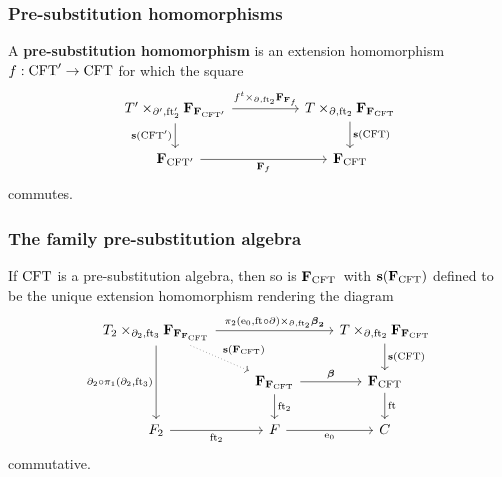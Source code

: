 \documentclass{beamer}
\newcommand\important[1]{\textbf{\color{red!90!black}#1}}
\begin{document}
\begin{frame}
\frametitle{\bf Pre-substitution homomorphisms}
A \important{pre-substitution homomorphism} is an extension homomorphism $f:\mathrm{CFT}'\to \mathrm{CFT}$
for which the square
\begin{equation*}
\begin{tikzcd}[ampersand replacement=\&,column sep=huge]
\cobesys{\stesyst'}{\famesys{\famesys{\stesys'}}}{\ebd'}{\eft[2]'}
  \ar{r}{\pullback{f^t}{\famehom{\famehom{f}}}{\ebd}{\eft[2]}}
  \ar{d}[swap]{\mathbf{s}(\stesys')}
  \&
\cobesys{\stesyst}{\famesys{\famesys{\stesys}}}{\ebd}{\eft[2]}
  \ar{d}{\mathbf{s}(\stesys)}
  \\
\famesys{\stesys'}
  \ar{r}[swap]{\famehom{f}}
  \&
\famesys{\stesys}
\end{tikzcd}
\end{equation*}
commutes.
\end{frame}

\begin{frame}
\frametitle{\bf The family pre-substitution algebra}
\begin{theorem}
If $\mathrm{CFT}$ is a pre-substitution algebra, then so is $\mathbf{F}_{\mathrm{CFT}}$\pause~with
$\mathbf{s}(\mathbf{F}_{\mathrm{CFT}})$ defined to be the unique extension homomorphism
rendering the diagram
\begin{equation*}
\begin{tikzcd}[ampersand replacement=\&]
\cobesys{\stesyst_2}{\famesys{\famesys{\famesys{\stesys}}}}{\ebd[2]}{\eft[3]}
  \ar[dotted]{dr}{\mathbf{s}(\famesys{\stesys})}
  \ar{rr}{\pullback{\pullbackpr{2}{\ectxext}{\eft\circ\ebd}}{\boldsymbol{\beta}_\mathbf{2}}{\ebd}{\eft[2]}}
  \ar{dd}[swap]{\ebd[2]\circ\pullbackpr{1}{\ebd[2]}{\eft[3]}}
  \&
  {}\&
\cobesys{\stesyst}{\famesys{\famesys{\stesys}}}{\ebd}{\eft[2]}
  \ar{d}{\mathbf{s}(\stesys)}
  \\
  {}\&
\famesys{\famesys{\stesys}}
  \ar{r}{\boldsymbol{\beta}}
  \ar{d}{\eft[2]}
  \&
\famesys{\stesys}
  \ar{d}{\eft}
  \\
\stesysf_2
  \ar{r}[swap]{\eft[2]}
  \&
\stesysf
  \ar{r}[swap]{\ectxext}
  \&
\stesysc
\end{tikzcd}
\end{equation*}
commutative.
\end{theorem}
\end{frame}
\end{document}
